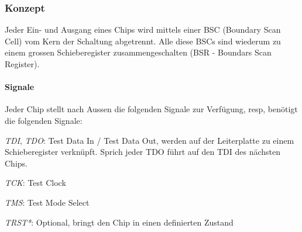 \begin{multicols}{2}
    \subsubsection{Konzept}
    Jeder Ein- und Ausgang eines Chips wird mittels einer BSC (Boundary Scan Cell) vom Kern der Schaltung abgetrennt. Alle diese BSCs sind wiederum zu einem grossen Schieberegister zusammengeschalten (BSR - Boundars Scan Register).
    
    \paragraph{Signale}
    Jeder Chip stellt nach Aussen die folgenden Signale zur Verfügung, resp, benötigt die folgenden Signale:
    \begin{compactitem}
        \item \textit{TDI}, \textit{TDO}: Test Data In / Test Data Out, werden auf der Leiterplatte zu einem Schieberegister verknüpft. Sprich jeder TDO führt auf den TDI des nächsten Chips.
        \item \textit{TCK}: Test Clock
        \item \textit{TMS}: Test Mode Select
        \item \textit{TRST*}: Optional, bringt den Chip in einen definierten Zustand
    \end{compactitem}


\end{multicols}
